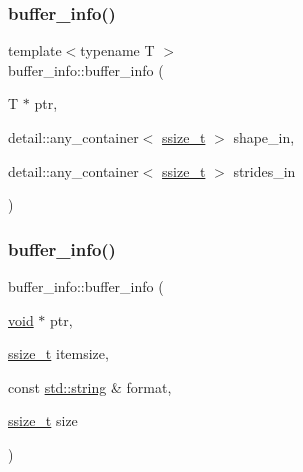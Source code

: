 \subsubsection{\texorpdfstring{buffer\_info()}{buffer\_info()}\hspace{0.1cm}{\footnotesize\ttfamily [3/8]}}
{\footnotesize\ttfamily template$<$typename T $>$ \\
buffer\+\_\+info\+::buffer\+\_\+info (\begin{DoxyParamCaption}\item[{T $\ast$}]{ptr,  }\item[{detail\+::any\+\_\+container$<$ \mbox{\hyperlink{detail_2common_8h_ac430d16fc097b3bf0a7469cfd09decda}{ssize\+\_\+t}} $>$}]{shape\+\_\+in,  }\item[{detail\+::any\+\_\+container$<$ \mbox{\hyperlink{detail_2common_8h_ac430d16fc097b3bf0a7469cfd09decda}{ssize\+\_\+t}} $>$}]{strides\+\_\+in }\end{DoxyParamCaption})\hspace{0.3cm}{\ttfamily [inline]}}

\mbox{\label{structbuffer__info_a4fcc193bf8c8693624eb20586471ca85}} 
\subsubsection{\texorpdfstring{buffer\_info()}{buffer\_info()}\hspace{0.1cm}{\footnotesize\ttfamily [4/8]}}
{\footnotesize\ttfamily buffer\+\_\+info\+::buffer\+\_\+info (\begin{DoxyParamCaption}\item[{\mbox{\hyperlink{_s_d_l__opengles2__gl2ext_8h_ae5d8fa23ad07c48bb609509eae494c95}{void}} $\ast$}]{ptr,  }\item[{\mbox{\hyperlink{detail_2common_8h_ac430d16fc097b3bf0a7469cfd09decda}{ssize\+\_\+t}}}]{itemsize,  }\item[{const \mbox{\hyperlink{_s_d_l__opengl__glext_8h_ab4ccfaa8ab0e1afaae94dc96ef52dde1}{std\+::string}} \&}]{format,  }\item[{\mbox{\hyperlink{detail_2common_8h_ac430d16fc097b3bf0a7469cfd09decda}{ssize\+\_\+t}}}]{size }\end{DoxyParamCaption})\hspace{0.3cm}{\ttfamily [inline]}}

\mbox{\label{structbuffer__info_afdadf4414d716e34b64a215014fc2dfb}} 
